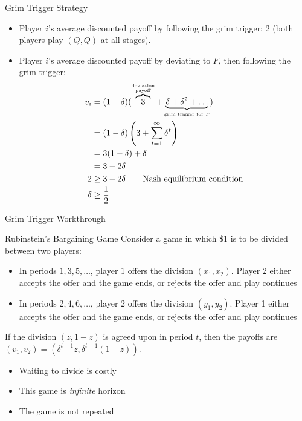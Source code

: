 \documentclass[10pt]{extarticle}
\begin{document}
\begin{problem}{Grim Trigger Strategy}
\begin{itemize}
      \item Player $i$'s average discounted payoff by following the grim trigger: $2$ (both players play $(Q,Q)$ at all stages).
      \item Player $i$'s average discounted payoff by deviating to $F$, then following the grim trigger:
        \begin{align*}
          v_i &= (1-\delta)(\overbrace{3}^{\substack{\text{\tiny deviation}\\\text{\tiny payoff}}} + \underbrace{\delta + \delta^2 + \dots}_{\text{\tiny grim trigger for $F$}})\\
              &= (1-\delta) \left(3 + \sum_{t=1}^{\infty}\delta^{t}\right)\\
              &= 3(1-\delta) + \delta\\
              &= 3-2\delta\\
          2 &\geq 3-2\delta \tag*{Nash equilibrium condition}\\
          \delta &\geq \frac{1}{2}
        \end{align*}
    \end{itemize}
  \end{problem}
  \begin{problem}{Grim Trigger Workthrough}
    \begin{tcbraster}[raster columns = 2,colframe = black!75!white,colback=white]
    \end{tcbraster}
  \end{problem}
  \begin{problem}{Rubinstein's Bargaining Game}
    Consider a game in which \$1 is to be divided between two players:
    \begin{itemize}\itemsep -2pt
      \item In periods $1,3,5,\dots$, player $1$ offers the division $(x_1,x_2)$. Player 2 either accepts the offer and the game ends, or rejects the offer and play continues
      \item In periods $2,4,6,\dots$, player $2$ offers the division $(y_1,y_2)$. Player 1 either accepts the offer and the game ends, or rejects the offer and play continues
    \end{itemize}
    If the division $(z,1-z)$ is agreed upon in period $t$, then the payoffs are $(v_1,v_2) = \left(\delta^{t-1}z,\delta^{t-1}(1-z)\right)$.
    \begin{itemize}\itemsep -2pt
      \item Waiting to divide is costly
      \item This game is \textit{infinite} horizon
      \item The game is not repeated
    \end{itemize}
  \end{problem}
\end{document}
